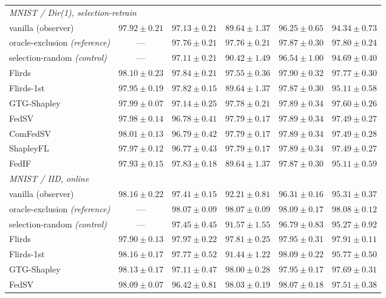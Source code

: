 \documentclass[letterpaper]{article} %
\theoremstyle{plain}
\begin{document}
\begin{table}[t]
\begin{tabular}{lccccc}
\hline
\multicolumn{6}{l}{\emph{MNIST / Dir(1), selection-retrain}} \\
vanilla (observer) & $97.92\pm0.21$ & $97.13\pm0.21$ & $89.64\pm1.37$ & $96.25\pm0.65$ & $94.34\pm0.73$ \\
oracle-exclusion \emph{(reference)} & --- & $97.76\pm0.21$ & $97.76\pm0.21$ & $97.87\pm0.30$ & $97.80\pm0.24$ \\
selection-random \emph{(control)} & --- & $97.11\pm0.21$ & $90.42\pm1.49$ & $96.54\pm1.00$ & $94.69\pm0.40$ \\
Flirds & $98.10\pm0.23$ & $97.84\pm0.21$ & $97.55\pm0.36$ & $97.90\pm0.32$ & $97.77\pm0.30$ \\
Flirds-1st & $97.95\pm0.19$ & $97.82\pm0.15$ & $89.64\pm1.37$ & $97.87\pm0.30$ & $95.11\pm0.58$ \\
GTG-Shapley & $97.99\pm0.07$ & $97.14\pm0.25$ & $97.78\pm0.21$ & $97.89\pm0.34$ & $97.60\pm0.26$ \\
FedSV & $97.98\pm0.14$ & $96.78\pm0.41$ & $97.79\pm0.17$ & $97.89\pm0.34$ & $97.49\pm0.27$ \\
ComFedSV & $98.01\pm0.13$ & $96.79\pm0.42$ & $97.79\pm0.17$ & $97.89\pm0.34$ & $97.49\pm0.28$ \\
ShapleyFL & $97.97\pm0.12$ & $96.77\pm0.43$ & $97.79\pm0.17$ & $97.89\pm0.34$ & $97.49\pm0.27$ \\
FedIF & $97.93\pm0.15$ & $97.83\pm0.18$ & $89.64\pm1.37$ & $97.87\pm0.30$ & $95.11\pm0.59$ \\
\hline
\multicolumn{6}{l}{\emph{MNIST / IID, online}} \\
vanilla (observer) & $98.16\pm0.22$ & $97.41\pm0.15$ & $92.21\pm0.81$ & $96.31\pm0.16$ & $95.31\pm0.37$ \\
oracle-exclusion \emph{(reference)} & --- & $98.07\pm0.09$ & $98.07\pm0.09$ & $98.09\pm0.17$ & $98.08\pm0.12$ \\
selection-random \emph{(control)} & --- & $97.45\pm0.45$ & $91.57\pm1.55$ & $96.79\pm0.83$ & $95.27\pm0.92$ \\
Flirds & $97.90\pm0.13$ & $97.97\pm0.22$ & $97.81\pm0.25$ & $97.95\pm0.31$ & $97.91\pm0.11$ \\
Flirds-1st & $98.16\pm0.17$ & $97.77\pm0.52$ & $91.44\pm1.22$ & $98.09\pm0.22$ & $95.77\pm0.50$ \\
GTG-Shapley & $98.13\pm0.17$ & $97.11\pm0.47$ & $98.00\pm0.28$ & $97.95\pm0.17$ & $97.69\pm0.31$ \\
FedSV & $98.09\pm0.07$ & $96.42\pm0.81$ & $98.03\pm0.19$ & $98.07\pm0.18$ & $97.51\pm0.38$ \\

\end{tabular}
\end{table}
\end{document}
